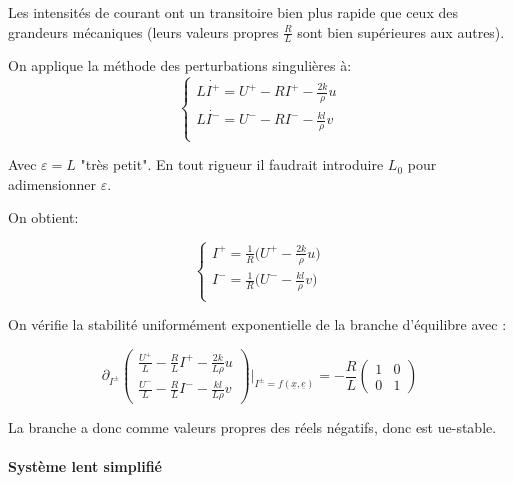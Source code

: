 \documentclass{report}
\begin{document}
Les intensités de courant ont un transitoire bien plus rapide que
ceux des grandeurs mécaniques (leurs valeurs propres $\frac{R}{L}$ sont bien supérieures aux autres).

On applique la méthode des perturbations singulières à:
\begin{equation*}
    \begin{cases}
        L\dot{I^{+}} = U^{+} - RI^{+} - \frac{2k}{\rho}u \\
        L\dot{I^{-}} = U^{-} - RI^{-} - \frac{kl}{\rho}v \\
    \end{cases}
\end{equation*}

Avec $\varepsilon = L$ "très petit". En tout rigueur il faudrait introduire
$L_0$ pour adimensionner $\varepsilon$.

On obtient:

\begin{equation*}
    \begin{cases}
        I^{+} = \frac{1}{R} \big(U^{+} - \frac{2k}{\rho}u \big) \\
        I^{-} = \frac{1}{R} \big(U^{-} - \frac{kl}{\rho}v \big)\\
    \end{cases}
\end{equation*}

On vérifie la stabilité uniformément exponentielle de la branche d'équilibre avec :

\begin{equation*}
    \partial_{I^{\pm}}
    \begin{pmatrix}
        \frac{U^{+}}{L} - \frac{R}{L}I^{+} - \frac{2k}{L\rho}u  \\
        \frac{U^{-}}{L} - \frac{R}{L}I^{-} - \frac{kl}{L\rho}v  
    \end{pmatrix} \biggr\rvert_{I^{\pm} = f(\underline{x}, \underline{e})}
    = -\frac{R}{L}
    \begin{pmatrix}
        1 & 0 \\
        0 & 1
    \end{pmatrix}
\end{equation*}

La branche a donc comme valeurs propres des réels négatifs, donc est ue-stable.

\paragraph{Système lent simplifié}
\end{document}

